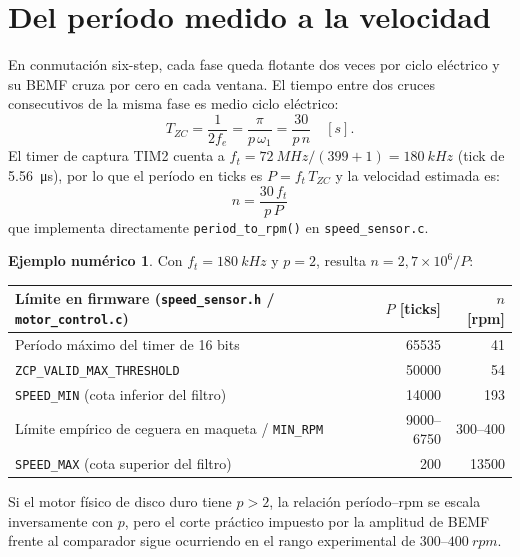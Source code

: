 \documentclass[11pt,a4paper,oneside]{report}
\theoremstyle{definition}
\newtheorem{ejemplo}{Ejemplo numérico}[chapter]
\theoremstyle{remark}
\begin{document}
\section{Del período medido a la velocidad}
En conmutación six-step, cada fase queda flotante dos veces por ciclo eléctrico
y su BEMF cruza por cero en cada ventana. El tiempo entre dos cruces
consecutivos de la misma fase es medio ciclo eléctrico:
\begin{equation}
  T_{ZC} = \frac{1}{2f_e} = \frac{\pi}{p\,\omega_1} = \frac{30}{p\,n}\quad[\si{s}].
\end{equation}
El timer de captura TIM2 cuenta a $f_t = \SI{72}{MHz}/(399+1) = \SI{180}{kHz}$
(tick de \SI{5,56}{\micro s}), por lo que el período en ticks es
$P = f_t\,T_{ZC}$ y la velocidad estimada es:
\begin{equation}
  \boxed{\;n = \frac{30\, f_t}{p\, P}\;}
  \label{eq:period2rpm}
\end{equation}
que implementa directamente \texttt{period\_to\_rpm()} en
\texttt{speed\_sensor.c}.

\begin{ejemplo}
Con $f_t = \SI{180}{kHz}$ y $p=2$, resulta $n = 2{,}7\times10^6/P$:
\begin{center}
\begin{tabular}{@{}lrr@{}}
\toprule
Límite en firmware (\texttt{speed\_sensor.h} / \texttt{motor\_control.c}) & $P$ [ticks] & $n$ [rpm] \\
\midrule
Período máximo del timer de 16 bits & 65535 & 41 \\
\texttt{ZCP\_VALID\_MAX\_THRESHOLD} & 50000 & 54 \\
\texttt{SPEED\_MIN} (cota inferior del filtro) & 14000 & 193 \\
Límite empírico de ceguera en maqueta / \texttt{MIN\_RPM} & 9000--6750 & 300--400 \\
\texttt{SPEED\_MAX} (cota superior del filtro) & 200 & 13500 \\
\bottomrule
\end{tabular}
\end{center}
Si el motor físico de disco duro tiene $p > 2$, la relación período--rpm se
escala inversamente con $p$, pero el corte práctico impuesto por la amplitud de
BEMF frente al comparador sigue ocurriendo en el rango experimental de
$300\text{--}\SI{400}{rpm}$.
\end{ejemplo}
\end{document}

